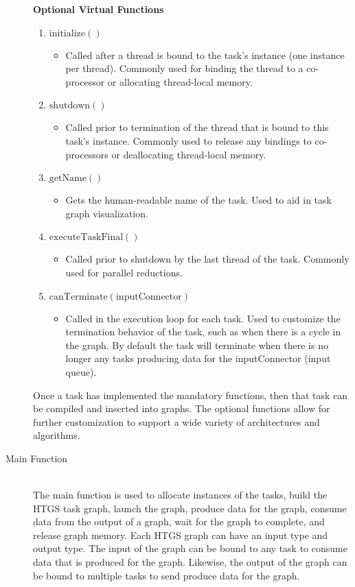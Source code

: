 \documentclass[]{article}
\begin{document}
\begin{description}
	\textbf{Optional Virtual Functions}
	\begin{enumerate}
	\item $\mathrm{initialize()}$
		\begin{itemize}
		\item Called after a thread is bound to the task's instance (one instance per thread). Commonly used for binding the thread to a co-processor or allocating thread-local memory.
		\end{itemize}
	\item $\mathrm{shutdown()}$
		\begin{itemize}
		\item Called prior to termination of the thread that is bound to this task's instance. Commonly used to release any bindings to co-processors or deallocating thread-local memory.
		\end{itemize}	
	\item $\mathrm{getName()}$
		\begin{itemize}
		\item Gets the human-readable name of the task. Used to aid in task graph visualization.
		\end{itemize}		
	\item $\mathrm{executeTaskFinal()}$
		\begin{itemize}
		\item Called prior to shutdown by the last thread of the task. Commonly used for parallel reductions.
		\end{itemize}		
	\item $\mathrm{canTerminate(inputConnector)}$
		\begin{itemize}
		\item Called in the execution loop for each task. Used to customize the termination behavior of the task, such as when there is a cycle in the graph. By default the task will terminate when there is no longer any tasks producing data for the inputConnector (input queue).
		\end{itemize}		
	\end{enumerate}

	Once a task has implemented the mandatory functions, then that task can be compiled and inserted into graphs. The optional functions allow for further customization to support a wide variety of architectures and algorithms.

\item[Main Function] \hfill \\
	The main function is used to allocate instances of the tasks, build the HTGS task graph, launch the graph, produce data for the graph, consume data from the output of a graph, wait for the graph to complete, and release graph memory. Each HTGS graph can have an input type and output type. The input of the graph can be bound to any task to consume data that is produced for the graph. Likewise, the output of the graph can be bound to multiple tasks to send produce data for the graph.
	
\end{description}
\end{document}
